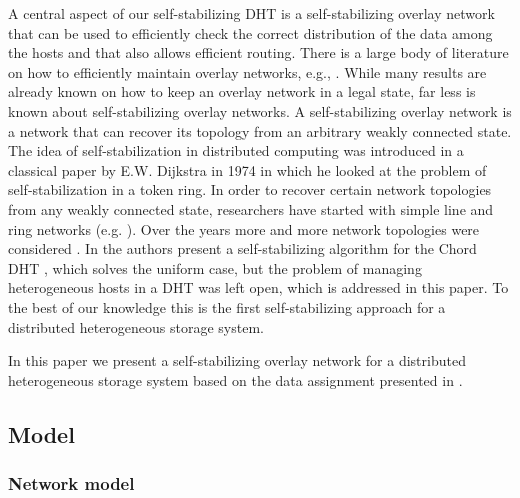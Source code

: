 \documentclass[11pt]{article}
\begin{document}
A central aspect of our self-stabilizing DHT is a self-stabilizing overlay
network that can be used to efficiently check the correct distribution of the
data among the hosts and that also allows efficient routing. There is a large
body of literature on how to efficiently maintain overlay networks, e.g.,
\cite{AS03:skip,AS04:hyperring,BK+04:Pagoda,RD01:pastry,HJ+03:skipnet,KSW05:self-repair,MNR02:viceroy,NW07:continous-discrete,RF+01:can,
SM+01:chord}. While many results are already known on how to keep an overlay
network in a legal state, far less is known about self-stabilizing overlay
networks. A self-stabilizing overlay network is a network that can recover its
topology from an arbitrary weakly connected state. The idea of
self-stabilization in distributed computing was introduced in a classical paper
by E.W. Dijkstra in 1974 \cite{D74:self-stab} in which he looked at the
problem of self-stabilization in a token ring. In order to recover certain
network topologies from any weakly connected state, researchers have started
with simple line and ring networks (e.g.
\cite{CF05:stab-ring,SR05:ring,ORS07:lin}). Over the years more and more
network topologies were considered
\cite{DK08,JRS+09:delaunay,JR+09:skip+,DT09,DT10,smallworld}. In
\cite{KKS11} the authors present a self-stabilizing algorithm for the Chord
DHT \cite{SM+01:chord}, which solves the uniform case, but the problem of
managing heterogeneous hosts in a DHT was left open, which is addressed in
this paper. To the best of our knowledge this is the first self-stabilizing
approach for a distributed heterogeneous storage system.

In this paper we present a self-stabilizing overlay network for a distributed
heterogeneous storage system based on the data assignment presented in
\cite{cone}.

\subsection{Model}

\subsubsection{Network model}
\end{document}
